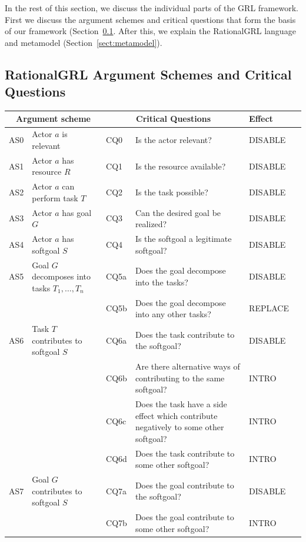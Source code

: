 In the rest of this section, we discuss the individual parts of the GRL framework. First we discuss the argument schemes and critical questions that form the basis of our framework (Section~\ref{sect:overview:as}. After this, we explain the RationalGRL language and metamodel (Section~\ref{sect:metamodel}). 

\subsection{RationalGRL Argument Schemes and Critical Questions}
\label{sect:overview:as}

\begin{table}[t]
\centering
\begin{tabularx}{\textwidth}{|l|l|l|X|l|l|}
\hline
\multicolumn{2}{|c|}{\textbf{Argument scheme}} & \multicolumn{2}{c|}{\textbf{Critical Questions}} & \textbf{Effect}\\
\hline
AS0 & Actor $a$ is relevant & CQ0 &Is the actor relevant? & DISABLE\\
\hline
AS1 & Actor $a$ has resource $R$ & CQ1 &Is the resource available? & DISABLE\\
\hline
AS2 & Actor $a$ can perform task $T$ & CQ2 &Is the task possible? & DISABLE\\
\hline
AS3 & Actor $a$ has goal $G$ & CQ3 & Can the desired goal be realized? & DISABLE\\
\hline
AS4 & Actor $a$ has softgoal $S$ & CQ4 & Is the softgoal a legitimate softgoal?& DISABLE\\
\hline
\hline
AS5 & Goal $G$ decomposes into tasks $T_1,\ldots,T_n$ & CQ5a & Does the goal decompose into the tasks?& DISABLE\\
& & CQ5b & Does the goal decompose into any other tasks?& REPLACE\\
\hline
AS6 & Task $T$ contributes to softgoal $S$& CQ6a & Does the task contribute to the softgoal?& DISABLE\\
&& CQ6b & Are there alternative ways of contributing to the same softgoal?& INTRO \\
&& CQ6c & Does the task have a side effect which contribute negatively to some other softgoal?& INTRO\\
&& CQ6d & Does the task contribute to some other softgoal?& INTRO\\
\hline
AS7 & Goal $G$ contributes to softgoal $S$ & CQ7a & Does the goal contribute to the softgoal?& DISABLE\\
&& CQ7b & Does the goal contribute to some other softgoal?& INTRO\\

\end{tabularx}
\end{table}
